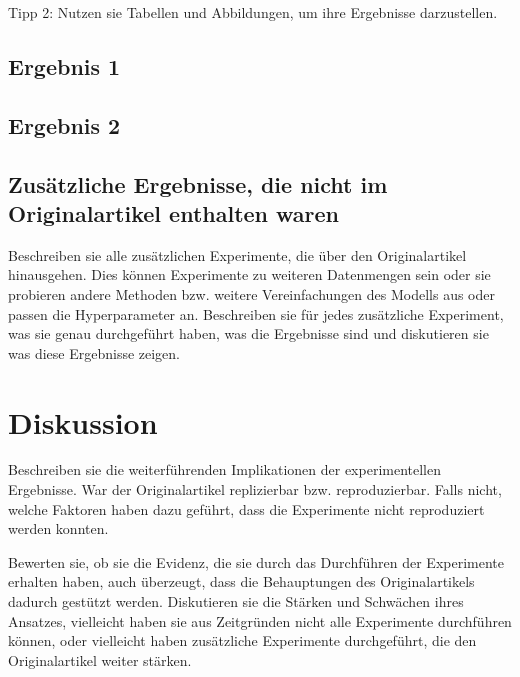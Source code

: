 \documentclass[DIV=13,fontsize=11pt]{scrartcl}
\begin{document}
Tipp 2: Nutzen sie Tabellen und Abbildungen, um ihre Ergebnisse darzustellen.


\subsection{Ergebnis 1}

\subsection{Ergebnis 2}

\subsection{Zusätzliche Ergebnisse, die nicht im Originalartikel enthalten waren}
Beschreiben sie alle zusätzlichen Experimente, die über den Originalartikel hinausgehen.
Dies können Experimente zu weiteren Datenmengen sein oder sie probieren andere Methoden bzw. weitere Vereinfachungen des Modells aus oder passen die Hyperparameter an.
Beschreiben sie für jedes zusätzliche Experiment, was sie genau durchgeführt haben, was die Ergebnisse sind und diskutieren sie was diese Ergebnisse zeigen.


\section{Diskussion}
Beschreiben sie die weiterführenden Implikationen der experimentellen Ergebnisse.
War der Originalartikel replizierbar bzw. reproduzierbar.
Falls nicht, welche Faktoren haben dazu geführt, dass die Experimente nicht reproduziert werden konnten.


Bewerten sie, ob sie die Evidenz, die sie durch das Durchführen der Experimente erhalten haben, auch überzeugt, dass die Behauptungen des Originalartikels dadurch gestützt werden.
Diskutieren sie die Stärken und Schwächen ihres Ansatzes, vielleicht haben sie aus Zeitgründen nicht alle Experimente durchführen können, oder vielleicht haben zusätzliche Experimente durchgeführt, die den Originalartikel weiter stärken.
\end{document}
